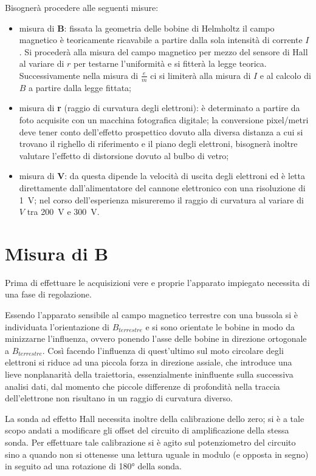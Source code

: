 \noindent Bisognerà procedere alle seguenti misure:
\begin{itemize}
	\item misura di \textbf{B}: fissata la geometria delle bobine di Helmholtz il campo magnetico è teoricamente ricavabile a partire dalla sola intensità di corrente $I$. Si procederà alla misura del campo magnetico per mezzo del sensore di Hall al variare di $r$ per testarne l'uniformità e si fitterà la legge teorica. Successivamente nella misura di $\tfrac{e}{m}$ ci si limiterà alla misura di $I$ e al calcolo di $B$ a partire dalla legge fittata;
	\item misura di \textbf{r} (raggio di curvatura degli elettroni): è determinato a partire da foto acquisite con un macchina fotografica digitale; la conversione pixel/metri deve tener conto dell'effetto prospettico dovuto alla diversa distanza a cui si trovano il righello di riferimento e il piano degli elettroni, bisognerà inoltre valutare l'effetto di distorsione dovuto al bulbo di vetro;
	\item misura di \textbf{V}: da questa dipende la velocità di uscita degli elettroni ed è letta direttamente dall'alimentatore del cannone elettronico con una risoluzione di \SI{1}{\volt}; nel corso dell'esperienza misureremo il raggio di curvatura al variare di $V$ tra \SI{200}{\volt} e \SI{300}{\volt}.
\end{itemize}

\section{Misura di \textbf{B}}
		Prima di effettuare le acquisizioni vere e proprie l'apparato impiegato necessita di una
		fase di regolazione.

		Essendo l'apparato sensibile al campo magnetico terrestre
		con una bussola si è individuata l'orientazione di $B_{terrestre}$
		e si sono orientate le bobine in modo da minizzarne l'influenza, ovvero ponendo
		l'asse delle bobine in direzione ortogonale a $B_{terrestre}$. Così facendo l'influenza
		di quest'ultimo sul moto circolare degli elettroni si riduce ad una
		piccola forza in direzione assiale, che introduce una lieve nonplanarità della traiettoria,
		essenzialmente ininfluente sulla successiva analisi dati, dal momento che
		piccole differenze di profondità nella traccia dell'elettrone non risultano
		in un raggio di curvatura diverso.

		La sonda ad effetto Hall necessita inoltre della calibrazione dello zero;
		si è a tale scopo andati a modificare gli offset del circuito di amplificazione della stessa sonda.
		Per effettuare tale calibrazione si è agito sul potenziometro del circuito sino
		a quando non si ottenesse una lettura uguale in modulo (e opposta in segno)
		in seguito ad una rotazione di \ang{180} della sonda.

